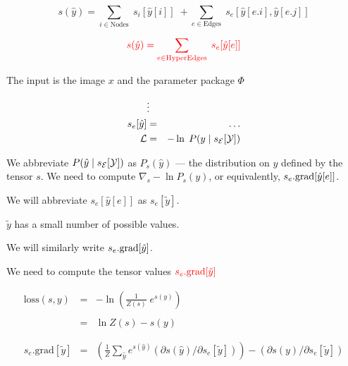{$$s(\hat{y}) = \sum_{i \in \mathrm{Nodes}}\; s_i[\hat{y}[i]]\; + \sum_{e \in \mathrm{Edges}}\;s_e[\hat{y}[e.i],\hat{y}[e.j]]$$

\vfill

$${\color{red} s(\hat{y}) = \sum_{e \in \mathrm{HyperEdges}}  \; s_e[\hat{y}[e]]}$$



The input is the image $x$ and the parameter package $\Phi$

\begin{eqnarray*}
 & \vdots & \\
s_e[\hat{y}] & = & \ldots \\
{\cal L} & = & - \ln\; P(y\;|\;s_{\cal E}[{\cal Y}])
\end{eqnarray*}

\vfill We abbreviate $P(\hat{y}\;|\;s_{\cal E}[{\cal Y}])$ as {\color{red} $P_s(\hat{y})$} --- the distribution on $\hat{y}$ defined by the tensor $s$.
\vfill
We need to compute {\color{red} $\nabla_s -\ln P_s(y)$}, or equivalently, {\color{red} $s_e.\mathrm{grad}[\hat{y}[e]]$}.


We will abbreviate $s_e[\hat{y}[e]]$ as {\color{red} $s_e[\tilde{y}]$}.

\vfill
{\color{red} $\tilde{y}$ has a small number of possible values.}

\vfill
We will similarly write {\color{red} $s_e.\mathrm{grad}[\tilde{y}]$}.

\vfill
We need to compute the tensor values ${\color{red} s_e.\mathrm{grad}[\tilde{y}]}$


\begin{eqnarray*}
  \mathrm{loss}(s,y) & = & - \ln \left(\frac{1}{Z(s)}\;e^{s(y)}\right) \\
  \\
  & = & \ln Z(s) - s(y) \\
  \\
  \\
  s_e.\mathrm{grad}[\tilde{y}]
    & = & \left(\frac{1}{Z} \sum_{\hat{y}} e^{s(\hat{y})} \left(\partial s(\hat{y})/\partial s_e[\tilde{y}]\right)\right)
    - \left(\partial s(y) /\partial s_e[\tilde{y}]\right)
\end{eqnarray*}


}

